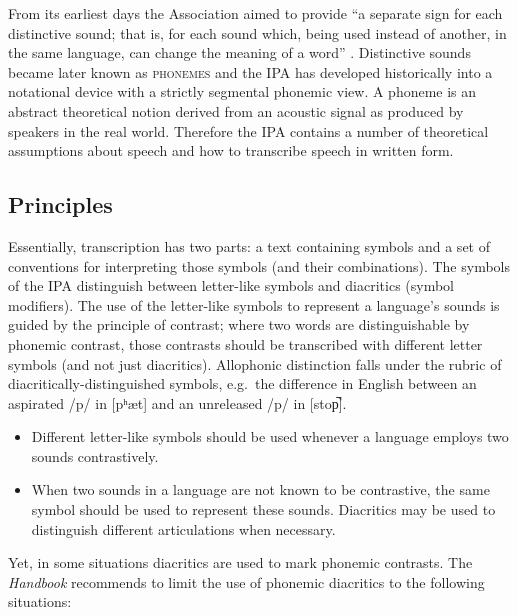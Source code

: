 \noindent From its earliest days the Association aimed to provide ``a separate sign for
each distinctive sound; that is, for each sound which, being used instead of
another, in the same language, can change the meaning of a word''
\citep[27]{IPA1999}. Distinctive sounds became later known as \textsc{phonemes}
and the IPA has developed historically into a notational device with a strictly
segmental phonemic view. A phoneme is an abstract theoretical notion derived
from an acoustic signal as produced by speakers in the real world. Therefore the
IPA contains a number of theoretical assumptions about speech and how to
transcribe speech in written form. 


\subsection*{Principles}
\label{IPAprinciples}

Essentially, transcription has two parts: a text containing symbols and a set 
of conventions for interpreting those symbols (and their combinations). 
The symbols of the IPA distinguish between letter-like symbols and
diacritics (symbol modifiers). The use of the letter-like symbols to represent 
a language's sounds is guided by the principle of contrast; where two words 
are distinguishable by phonemic contrast, those contrasts should be transcribed 
with different letter symbols (and not just diacritics). Allophonic distinction 
falls under the rubric of diacritically-distinguished symbols, e.g.\ the 
difference in English between an aspirated /p/ in [pʰæt] and 
an unreleased /p/ in [stop̚]. 

\begin{itemize}

	\item Different letter-like symbols should be used whenever
          a language employs two sounds contrastively.
	\item When two sounds in a language are not known to be contrastive, the same
          symbol should be used to represent these sounds. Diacritics may
          be used to distinguish different articulations when necessary.
\end{itemize}          
          
\noindent Yet, in some situations diacritics are used to mark phonemic
contrasts. The \textit{Handbook} recommends to limit the use of phonemic
diacritics to the following situations: 

